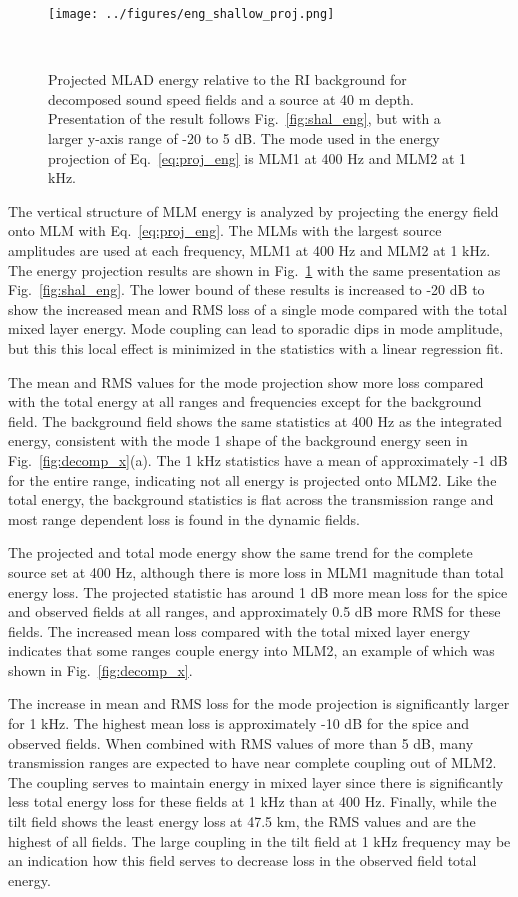 \documentclass[preprint,NumberedRefs]{JASA}
\begin{document}
\begin{figure}
\texttt{[image: ../figures/eng\_shallow\_proj.png]}
    \caption{Projected MLAD energy relative to the RI background for decomposed sound speed fields and a source at 40 m depth. Presentation of the result follows Fig.~\ref{fig:shal_eng}, but with a larger y-axis range of -20 to 5 dB. The mode used in the energy projection of Eq.~\eqref{eq:proj_eng} is MLM1 at 400 Hz and MLM2 at 1 kHz.}
    \label{fig:shal_proj}
\end{figure}
The vertical structure of MLM energy is analyzed by projecting the energy field onto MLM with Eq.~\eqref{eq:proj_eng}. The MLMs with the largest source amplitudes are used at each frequency, MLM1 at 400 Hz and MLM2 at 1 kHz. The energy projection results are shown in Fig.~\ref{fig:shal_proj} with the same presentation as Fig.~\ref{fig:shal_eng}. The lower bound of these results is increased to -20 dB to show the increased mean and RMS loss of a single mode compared with the total mixed layer energy. Mode coupling can lead to sporadic dips in mode amplitude, but this this local effect is minimized in the statistics with a linear regression fit.

The mean and RMS values for the mode projection show more loss compared with the total energy at all ranges and frequencies except for the background field. The background field shows the same statistics at 400 Hz as the integrated energy, consistent with the mode 1 shape of the background energy seen in Fig.~\ref{fig:decomp_x}(a). The 1 kHz statistics have a mean of approximately -1 dB for the entire range, indicating not all energy is projected onto MLM2. Like the total energy, the background statistics is flat across the transmission range and most range dependent loss is found in the dynamic fields.

The projected and total mode energy show the same trend for the complete source set at 400 Hz, although there is more loss in MLM1 magnitude than total energy loss. The projected statistic has around 1 dB more mean loss for the spice and observed fields at all ranges, and approximately 0.5 dB more RMS for these fields. The increased mean loss compared with the total mixed layer energy indicates that some ranges couple energy into MLM2, an example of which was shown in Fig.~\ref{fig:decomp_x}.

The increase in mean and RMS loss for the mode projection is significantly larger for 1 kHz. The highest mean loss is approximately -10 dB for the spice and observed fields. When combined with RMS values of more than 5 dB, many transmission ranges are expected to have near complete coupling out of MLM2. The coupling serves to maintain energy in mixed layer since there is significantly less total energy loss for these fields at 1 kHz than at 400 Hz. Finally, while the tilt field shows the least energy loss at 47.5 km, the RMS values and are the highest of all fields. The large coupling in the tilt field at 1 kHz frequency may be an indication how this field serves to decrease loss in the observed field total energy.
\end{document}

